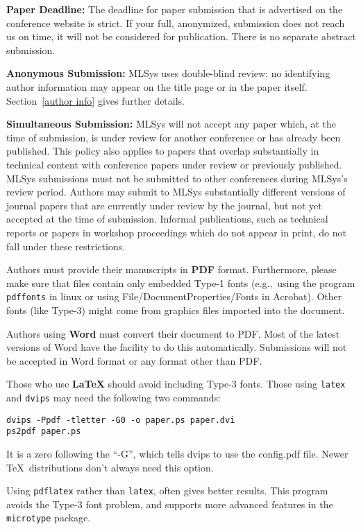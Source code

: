 \documentclass{article}
\begin{document}
\textbf{Paper Deadline:} The deadline for paper submission that is
advertised on the conference website is strict. If your full,
anonymized, submission does not reach us on time, it will not be
considered for publication. There is no separate abstract submission.

\textbf{Anonymous Submission:} MLSys uses double-blind review: no identifying
author information may appear on the title page or in the paper
itself. Section~\ref{author info} gives further details.

\textbf{Simultaneous Submission:} MLSys will not accept any paper which,
at the time of submission, is under review for another conference or
has already been published. This policy also applies to papers that
overlap substantially in technical content with conference papers
under review or previously published. MLSys submissions must not be
submitted to other conferences during MLSys's review period. Authors
may submit to MLSys substantially different versions of journal papers
that are currently under review by the journal, but not yet accepted
at the time of submission. Informal publications, such as technical
reports or papers in workshop proceedings which do not appear in
print, do not fall under these restrictions.

\medskip

Authors must provide their manuscripts in \textbf{PDF} format.
Furthermore, please make sure that files contain only embedded Type-1 fonts
(e.g.,~using the program \texttt{pdffonts} in linux or using
File/DocumentProperties/Fonts in Acrobat). Other fonts (like Type-3)
might come from graphics files imported into the document.

Authors using \textbf{Word} must convert their document to PDF\@. Most
of the latest versions of Word have the facility to do this
automatically. Submissions will not be accepted in Word format or any
format other than PDF\@.

Those who use \textbf{\LaTeX} should avoid including Type-3 fonts.
Those using \texttt{latex} and \texttt{dvips} may need the following
two commands:

{\footnotesize
\begin{verbatim}
dvips -Ppdf -tletter -G0 -o paper.ps paper.dvi
ps2pdf paper.ps
\end{verbatim}}
It is a zero following the ``-G'', which tells dvips to use
the config.pdf file. Newer \TeX\ distributions don't always need this
option.

Using \texttt{pdflatex} rather than \texttt{latex}, often gives better
results. This program avoids the Type-3 font problem, and supports more
advanced features in the \texttt{microtype} package.
\end{document}
